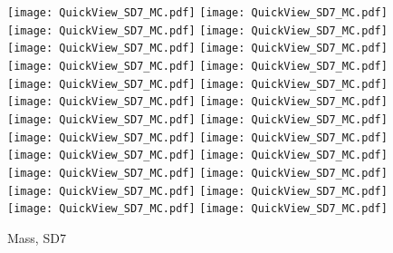 \documentclass[amsmath,amssymb,aps,floatfix]{revtex4-1}
\begin{document}
\begin{figure}
   \centering
   \texttt{[image: QuickView\_SD7\_MC.pdf]}
   \texttt{[image: QuickView\_SD7\_MC.pdf]}
   \texttt{[image: QuickView\_SD7\_MC.pdf]}
   \texttt{[image: QuickView\_SD7\_MC.pdf]}\\
   \texttt{[image: QuickView\_SD7\_MC.pdf]}
   \texttt{[image: QuickView\_SD7\_MC.pdf]}
   \texttt{[image: QuickView\_SD7\_MC.pdf]}
   \texttt{[image: QuickView\_SD7\_MC.pdf]}\\
   \texttt{[image: QuickView\_SD7\_MC.pdf]}
   \texttt{[image: QuickView\_SD7\_MC.pdf]}
   \texttt{[image: QuickView\_SD7\_MC.pdf]}
   \texttt{[image: QuickView\_SD7\_MC.pdf]}\\
   \texttt{[image: QuickView\_SD7\_MC.pdf]}
   \texttt{[image: QuickView\_SD7\_MC.pdf]}
   \texttt{[image: QuickView\_SD7\_MC.pdf]}
   \texttt{[image: QuickView\_SD7\_MC.pdf]}\\
   \texttt{[image: QuickView\_SD7\_MC.pdf]}
   \texttt{[image: QuickView\_SD7\_MC.pdf]}
   \texttt{[image: QuickView\_SD7\_MC.pdf]}
   \texttt{[image: QuickView\_SD7\_MC.pdf]}\\
   \texttt{[image: QuickView\_SD7\_MC.pdf]}
   \texttt{[image: QuickView\_SD7\_MC.pdf]}
   \texttt{[image: QuickView\_SD7\_MC.pdf]}
   \texttt{[image: QuickView\_SD7\_MC.pdf]}\\
   \caption{Mass, SD7}
   \label{Figure:SD7Result}
\end{figure}
\end{document}
